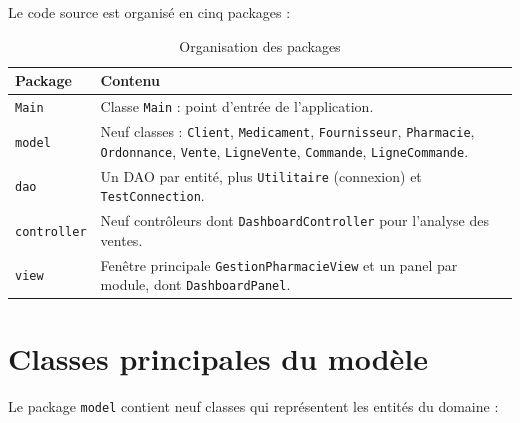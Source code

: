 \documentclass[12pt,a4paper]{report}
\begin{document}
Le code source est organisé en cinq packages :

\begin{table}[H]
\centering
\begin{tabularx}{\textwidth}{lX}
\toprule
\textbf{Package} & \textbf{Contenu} \\
\midrule
\texttt{Main}       & Classe \texttt{Main} : point d'entrée de l'application. \\
\texttt{model}      & Neuf classes : \texttt{Client}, \texttt{Medicament}, \texttt{Fournisseur}, \texttt{Pharmacie}, \texttt{Ordonnance}, \texttt{Vente}, \texttt{LigneVente}, \texttt{Commande}, \texttt{LigneCommande}. \\
\texttt{dao}        & Un DAO par entité, plus \texttt{Utilitaire} (connexion) et \texttt{TestConnection}. \\
\texttt{controller} & Neuf contrôleurs dont \texttt{DashboardController} pour l'analyse des ventes. \\
\texttt{view}       & Fenêtre principale \texttt{GestionPharmacieView} et un panel par module, dont \texttt{DashboardPanel}. \\
\bottomrule
\end{tabularx}
\caption{Organisation des packages}
\end{table}

\section{Classes principales du modèle}

Le package \texttt{model} contient neuf classes qui représentent les entités du domaine :
\end{document}
